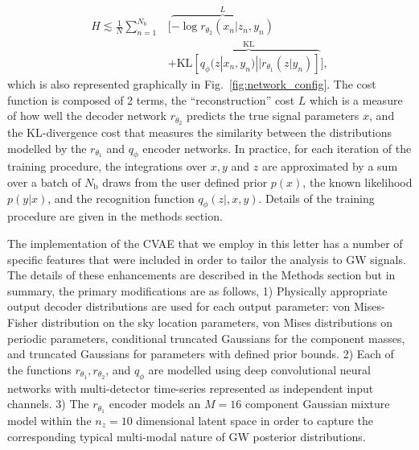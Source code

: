 \documentclass[%
showpacs,
nofootinbib,
 amsmath,amssymb,
 aps,
 twocolumn,
 prl,
 reprint,
floatfix,
]{revtex4-1}
\begin{document}
%
\begin{align}\label{eq:cost3} H \lesssim
\frac{1}{N}\sum_{n=1}^{N_{\text{b}}}&\Big[\overbrace{-\log
r_{\theta_{2}}(x_{n}|z_{n},y_{n})}^{L}\nonumber\\
&+\overbrace{\text{KL}\left[q_{\phi}(z|x_{n},y_{n})||r_{\theta_{1}}(z|y_{n})\right]}^{\text{KL}}\Big],
\end{align}
%
which is also represented graphically in Fig.~\ref{fig:network_config}.
The cost function is composed of 2 terms, the ``reconstruction'' cost $L$ which
is a measure of how well the decoder network $r_{\theta_2}$ predicts the true
signal parameters $x$, and the \ac{KL}-divergence cost that measures the
similarity between the distributions modelled by the $r_{\theta_1}$ and
$q_{\phi}$ encoder networks. In practice, for each iteration of the training
procedure, the integrations over $x,y$ and $z$ are approximated by a sum over a
batch of $N_{\text{b}}$ draws from the user defined prior $p(x)$, the known
likelihood $p(y|x)$, and the recognition function $q_{\phi}(z|,x,y)$. Details
of the training procedure are given in the methods section.  

%
%
The implementation of the \ac{CVAE} that we employ in this letter has a
number of specific features that were included in order to tailor the analysis to
\ac{GW} signals. The details of these enhancements are described in the Methods
section but in summary, the primary modifications are as follows, 1) Physically 
appropriate output decoder distributions are used for each output parameter: 
von Mises-Fisher distribution on the sky location parameters, von Mises 
distributions on periodic parameters, conditional truncated Gaussians for 
the component masses, and truncated Gaussians for
parameters with defined prior bounds. 2) Each of the
functions $r_{\theta_1},r_{\theta_2}$, and $q_{\phi}$ are modelled using deep
convolutional neural networks with multi-detector time-series represented as
independent input channels. 3) The $r_{\theta_1}$ encoder models an $M=16$ component
Gaussian mixture model within the $n_{z}=10$ dimensional latent space in order
to capture the corresponding typical multi-modal nature of \ac{GW} posterior
distributions.  
\end{document}
